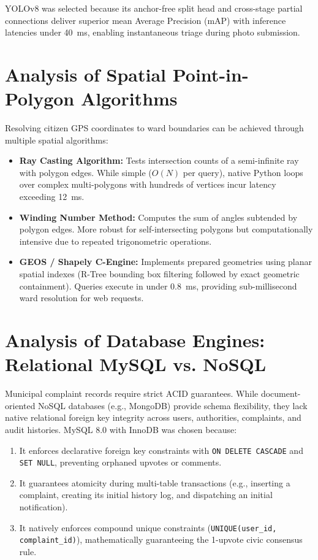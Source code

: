 \documentclass[12pt,a4paper]{report}
\begin{document}
YOLOv8 was selected because its anchor-free split head and cross-stage partial connections deliver superior mean Average Precision (mAP) with inference latencies under 40~ms, enabling instantaneous triage during photo submission.

\section{Analysis of Spatial Point-in-Polygon Algorithms}
Resolving citizen GPS coordinates to ward boundaries can be achieved through multiple spatial algorithms:
\begin{itemize}
    \item \textbf{Ray Casting Algorithm:} Tests intersection counts of a semi-infinite ray with polygon edges. While simple ($O(N)$ per query), native Python loops over complex multi-polygons with hundreds of vertices incur latency exceeding 12~ms.
    \item \textbf{Winding Number Method:} Computes the sum of angles subtended by polygon edges. More robust for self-intersecting polygons but computationally intensive due to repeated trigonometric operations.
    \item \textbf{GEOS / Shapely C-Engine:} Implements prepared geometries using planar spatial indexes (R-Tree bounding box filtering followed by exact geometric containment). Queries execute in under 0.8~ms, providing sub-millisecond ward resolution for web requests.
\end{itemize}

\section{Analysis of Database Engines: Relational MySQL vs. NoSQL}
Municipal complaint records require strict ACID guarantees. While document-oriented NoSQL databases (e.g., MongoDB) provide schema flexibility, they lack native relational foreign key integrity across users, authorities, complaints, and audit histories. MySQL 8.0 with InnoDB was chosen because:
\begin{enumerate}
    \item It enforces declarative foreign key constraints with \texttt{ON DELETE CASCADE} and \texttt{SET NULL}, preventing orphaned upvotes or comments.
    \item It guarantees atomicity during multi-table transactions (e.g., inserting a complaint, creating its initial history log, and dispatching an initial notification).
    \item It natively enforces compound unique constraints (\texttt{UNIQUE(user\_id, complaint\_id)}), mathematically guaranteeing the 1-upvote civic consensus rule.
\end{enumerate}
\end{document}
